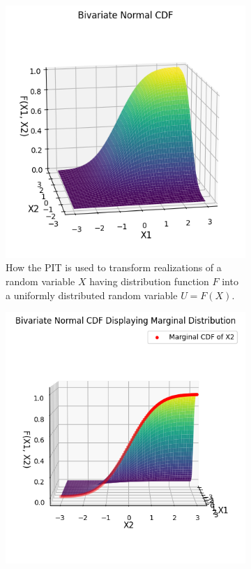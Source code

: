 \begin{figure}
    \centering
    \begin{subfigure}[t]{0.45\linewidth}
        \centering
        \includegraphics[width=\linewidth]{3Theory/pictures/BivariateCDF.png}
        \caption{How the \gls{PIT} is used to transform realizations of a random variable $X$ having distribution function $F$ into a uniformly distributed random variable $U = F(X)$.}
    \end{subfigure}
    \hfill
    \begin{subfigure}[t]{0.45\linewidth}
        \centering
        \includegraphics[width=\linewidth]{3Theory/pictures/MarginalIllustrated.png}

\end{subfigure}
\end{figure}
